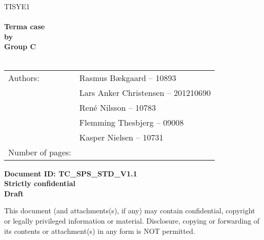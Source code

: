 \documentclass[Main]{subfiles}
\begin{document}
\begin{center}

\textsc{\Large TISYE1}\\[0.5cm]


\HRule \\[0.4cm]

{ \huge \bfseries Terma case}\\[0.4cm]
{ \huge \bfseries by}\\[0.4cm] 
{ \huge \bfseries Group C}\\[0.4cm]

\HRule \\[1.5cm]

\begin{tabular}{p{}|p{}}
\hline 
Authors: & Rasmus Bækgaard -- 10893\\ &Lars Anker Christensen -- 201210690\\ &René Nilsson -- 10783\\ &Flemming Thesbjerg -- 09008\\ &Kasper Nielsen -- 10731\\ 
\hline 
Number of pages: & \pageref{LastPage} \\
\hline 
\end{tabular} 

\textbf{\Large Document ID: TC\_SPS\_STD\_V1.1}\\
\textbf{\Large Strictly confidential}\\
\textbf{\Large Draft}

This document (and attachments(s), if any) may contain confidential, copyright or legally privileged information or material.
Disclosure, copying or forwarding of its contents or attachment(s) in any form is NOT permitted.
\end{center}
\end{document}
